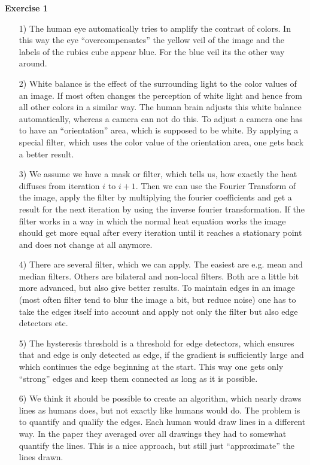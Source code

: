\documentclass[12pt]{article}
\begin{document}
	\textbf{Exercise 1}\\
	\begin{itemize}
		\item[1)] The human eye automatically tries to amplify the contrast of colors. In this way the eye ``overcompensates'' the yellow veil of the image and the labels of the rubics cube appear blue. For the blue veil its the other way around. \\
		\item[2)] White balance is the effect of the surrounding light to the color values of an image. If most often changes the perception of white light and hence from all other colors in a similar way. The human brain adjusts this white balance automatically, whereas a camera can not do this. To adjust a camera one has to have an ``orientation'' area, which is supposed to be white. By applying a special filter, which uses the color value of the orientation area, one gets back a better result.\\
		\item[3)] We assume we have a mask or filter, which tells us, how exactly the heat diffuses from iteration $i$ to $i+1$. Then we can use the Fourier Transform of the image, apply the filter by multiplying the fourier coefficients and get a result for the next iteration by using the inverse fourier transformation. If the filter works in a way in which the normal heat equation works the image should get more equal after every iteration until it reaches a stationary point and does not change at all anymore.\\
		\item[4)] There are several filter, which we can apply. The easiest are e.g. mean and median filters. Others are bilateral and non-local filters. Both are a little bit more advanced, but also give better results. To maintain edges in an image (most often filter tend to blur the image a bit, but reduce noise) one has to take the edges itself into account and apply not only the filter but also edge detectors etc.\\
		\item[5)] The hysteresis threshold is a threshold for edge detectors, which ensures that and edge is only detected as edge, if the gradient is sufficiently large and which continues the edge beginning at the start. This way one gets only ``strong'' edges and keep them connected as long as it is possible.\\
		\item[6)] We think it should be possible to create an algorithm, which nearly draws lines as humans does, but not exactly like humans would do. The problem is to quantify and qualify the edges. Each human would draw lines in a different way. In the paper they averaged over all drawings they had to somewhat quantify the lines. This is a nice approach, but still just ``approximate'' the lines drawn.
	\end{itemize}
\end{document}
